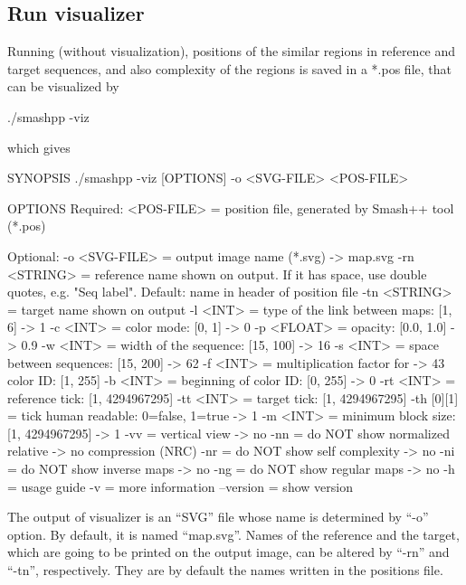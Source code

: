 \subsection{Run \smashpp visualizer}
Running \smashpp (without visualization), positions of the similar regions in reference and target sequences, and also complexity of the regions is saved in a *.pos file, that can be visualized by
\begin{code}[style=bash]
./smashpp -viz
\end{code}
which gives
\begin{code}[style=bash]
SYNOPSIS
  ./smashpp -viz [OPTIONS]  -o <SVG-FILE>  <POS-FILE>

OPTIONS
  Required:
  <POS-FILE>         = position file, generated by
                       Smash++ tool (*.pos)

  Optional:
  -o  <SVG-FILE>     = output image name (*.svg)             -> map.svg
  -rn <STRING>       = reference name shown on output. If it
                       has space, use double quotes, e.g.
                       "Seq label". Default: name in header
                       of position file
  -tn <STRING>       = target name shown on output
  -l  <INT>          = type of the link between maps: [1, 6] -> 1
  -c  <INT>          = color mode: [0, 1]                    -> 0
  -p  <FLOAT>        = opacity: [0.0, 1.0]                   -> 0.9
  -w  <INT>          = width of the sequence: [15, 100]      -> 16
  -s  <INT>          = space between sequences: [15, 200]    -> 62
  -f  <INT>          = multiplication factor for             -> 43
                       color ID: [1, 255]
  -b  <INT>          = beginning of color ID: [0, 255]       -> 0
  -rt <INT>          = reference tick: [1, 4294967295]
  -tt <INT>          = target tick: [1, 4294967295]
  -th [0][1]         = tick human readable: 0=false, 1=true  -> 1
  -m  <INT>          = minimum block size: [1, 4294967295]   -> 1
  -vv                = vertical view                         -> no
  -nn                = do NOT show normalized relative       -> no
                       compression (NRC)
  -nr                = do NOT show self complexity           -> no
  -ni                = do NOT show inverse maps              -> no
  -ng                = do NOT show regular maps              -> no
  -h                 = usage guide
  -v                 = more information
  --version          = show version
\end{code}

The output of \smashpp visualizer is an ``SVG'' file whose name is determined by ``-o'' option. By default, it is named ``map.svg''. 
Names of the reference and the target, which are going to be printed on the output image, can be altered by ``-rn'' and ``-tn'', respectively. They are by default the names written in the positions file. 

